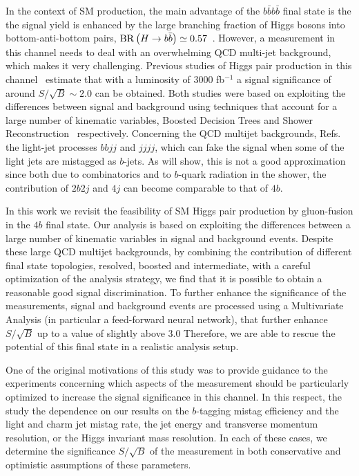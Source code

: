 In the context of SM production,
the main advantage of the $b\bar{b}b\bar{b}$ final state is the the signal yield
is enhanced by the large branching fraction of Higgs bosons into bottom-anti-bottom
pairs, ${\rm BR}\left( H\to b\bar{b}\right)\simeq 0.57$~\cite{Dittmaier:2012vm}.
%
However, a measurement in this channel
needs to deal with an overwhelming QCD multi-jet background,
which makes it very challenging.
%
Previous studies of Higgs pair production in this
channel~\cite{Wardrope:2014kya,deLima:2014dta}
estimate that with a luminosity of
3000 fb$^{-1}$ a signal significance of around $S/\sqrt{B}\sim 2.0$ can be obtained.
%
Both studies were based on exploiting the differences between signal and background
using techniques that account for a large number of kinematic
variables, Boosted Decision Trees
and Shower Reconstruction~\cite{Soper:2011cr} respectively.
%
Concerning the QCD multijet backgrounds, Refs.~\cite{Wardrope:2014kya,deLima:2014dta} the light-jet processes $bbjj$ and
$jjjj$,
which can fake the signal when 
some of the light jets are mistagged as $b$-jets.
%
As will show, this is not a good approximation since both due to
combinatorics and to $b$-quark radiation in the shower, the
contribution of $2b2j$ and $4j$ can become comparable
to that of $4b$.

In this work we revisit the feasibility of SM Higgs pair production by gluon-fusion
in the $4b$ final state.
%
Our analysis is based on exploiting the differences between a large
number of kinematic variables in signal and background events.
%
Despite these large QCD multijet backgrounds, by combining the contribution of different final state
topologies, resolved, boosted and intermediate, with a careful optimization
of the analysis strategy, we find that it is possible to obtain a reasonable
good signal discrimination.
%
To further enhance the significance of the measurements, signal and background events
are processed using a Multivariate Analysis (in particular a feed-forward neural
network), that further enhance $S/\sqrt{B}$ up to a value of slightly above 3.0
%
Therefore, we are able to rescue the potential of this final state in a realistic
analysis setup.

One of the original motivations of this study was to provide guidance to the experiments
concerning which aspects of the measurement should be particularly optimized
to increase the signal significance in this channel.
%
In this respect, the study the dependence on our results on the $b$-tagging mistag
efficiency and the light and charm jet mistag rate, the jet energy and transverse
momentum resolution, or the Higgs invariant mass resolution.
%
In each of these cases, we determine the significance
$S/\sqrt{B}$ of the
measurement in both conservative and optimistic assumptions of these
parameters.


